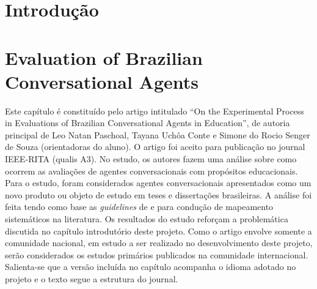 \documentclass[qualificacao,doutorado]{packages/icmc}
\begin{document}
{
\textual
}

\justifying

\chapter{Introdução}
\label{chapter:introducao}


%

\chapter{Evaluation of Brazilian Conversational Agents}
\noindent Este capítulo é constituído pelo artigo intitulado ``On the Experimental Process in Evaluations of Brazilian Conversational Agents in Education'', de autoria principal de Leo Natan Paschoal, Tayana Uchôa Conte e Simone do Rocio Senger de Souza (orientadoras do aluno). O artigo foi aceito para publicação no journal IEEE-RITA (qualis A3). No estudo, os autores fazem uma análise sobre como ocorrem as avaliações de agentes conversacionais com propósitos educacionais. Para o estudo, foram considerados agentes conversacionais apresentados como um novo produto ou objeto de estudo em teses e dissertações brasileiras. A análise foi feita tendo como base as \textit{guidelines} de  e  para condução de mapeamento sistemáticos na literatura. Os resultados do estudo reforçam a problemática discutida no capítulo introdutório deste projeto. Como o artigo envolve somente a comunidade nacional, em estudo a ser realizado no desenvolvimento deste projeto, serão considerados os estudos primários publicados na comunidade internacional. Salienta-se que a versão incluída no capítulo acompanha o idioma adotado no projeto e o texto segue a estrutura do journal.

\end{document}
